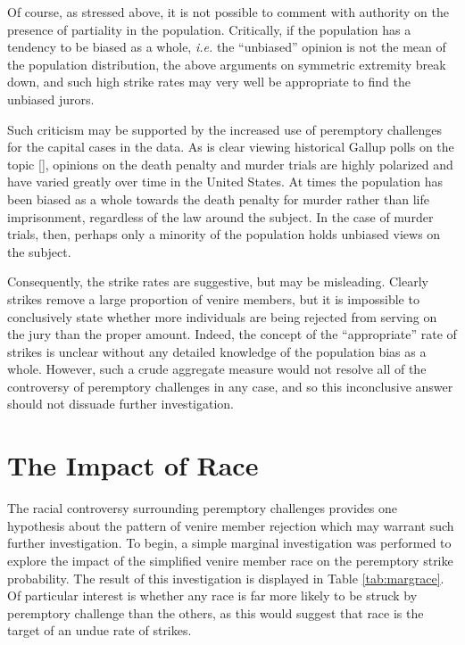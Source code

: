 Of course, as stressed above, it is not possible to comment with authority on the presence of partiality in the
population. Critically, if the population has a tendency to be biased as a whole, \textit{i.e.} the ``unbiased'' opinion is not 
the mean of the population distribution, the above arguments on symmetric extremity break down, and such high strike rates may
very well be appropriate to find the unbiased jurors.

Such criticism may be supported by the increased use of peremptory challenges for the capital cases in the data. As is clear
viewing historical Gallup polls on the topic [\cite{gallupdeath}], opinions on the death penalty and murder trials are highly
polarized and have varied greatly over time in the United States. At
times the population has been biased as a whole towards the death
penalty for murder rather than life imprisonment, regardless of the law around the subject. In the case of murder trials, then,
perhaps only a minority of the population holds unbiased views on the subject.

Consequently, the strike rates are suggestive, but may be misleading. Clearly strikes remove a large proportion of
venire members, but it is impossible to conclusively state whether more individuals are being rejected from serving on the jury
than the proper amount. Indeed, the concept of the ``appropriate'' rate of strikes is unclear without any detailed knowledge
of the population bias as a whole. However, such a crude aggregate measure would not resolve all of the controversy of peremptory
challenges in any case, and so this inconclusive answer should not dissuade further investigation.

\section{The Impact of Race} \label{sec:impactrace} 

The racial controversy surrounding peremptory challenges provides one hypothesis about the pattern of venire member rejection
which may warrant such further investigation. To begin, a simple marginal investigation was performed to explore the impact of the
simplified venire member race on the peremptory strike probability. The result of this investigation is displayed in Table
\ref{tab:margrace}. Of particular interest is whether any race is far more likely to be struck by peremptory challenge than the
others, as this would suggest that race is the target of an undue rate of strikes.

